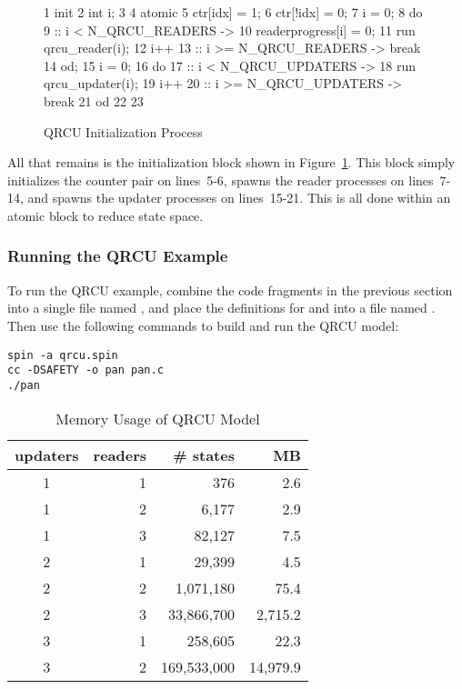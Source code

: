 \begin{figure}[htbp]
{ \scriptsize
\begin{verbbox}
  1 init {
  2   int i;
  3
  4   atomic {
  5     ctr[idx] = 1;
  6     ctr[!idx] = 0;
  7     i = 0;
  8     do
  9     :: i < N_QRCU_READERS ->
 10       readerprogress[i] = 0;
 11       run qrcu_reader(i);
 12       i++
 13     :: i >= N_QRCU_READERS -> break
 14     od;
 15     i = 0;
 16     do
 17     :: i < N_QRCU_UPDATERS ->
 18       run qrcu_updater(i);
 19       i++
 20     :: i >= N_QRCU_UPDATERS -> break
 21     od
 22   }
 23 }
\end{verbbox}
}
\centering
\theverbbox
\caption{QRCU Initialization Process}
\label{fig:analysis:QRCU Initialization Process}
\end{figure}

All that remains is the initialization block shown in
Figure~\ref{fig:analysis:QRCU Initialization Process}.
This block simply initializes the counter pair on lines~5-6,
spawns the reader processes on lines~7-14, and spawns the updater
processes on lines~15-21.
This is all done within an atomic block to reduce state space.

\subsubsection{Running the QRCU Example}
\label{sec:formal:Running the QRCU Example}

To run the QRCU example, combine the code fragments in the previous
section into a single file named , and place the definitions
for  and  into a file named
.
Then use the following commands to build and run the QRCU model:

\vspace{5pt}
\begin{minipage}[t]{\columnwidth}
\scriptsize
\begin{verbatim}
spin -a qrcu.spin
cc -DSAFETY -o pan pan.c
./pan
\end{verbatim}
\end{minipage}
\vspace{5pt}

\begin{table}
\footnotesize
\centering
\begin{tabular}{c|r|r|r}
	updaters &
	    readers &
		   \# states & MB \\
	\hline
	1 & 1 &         376 &      2.6 \\
	\hline
	1 & 2 &       6,177 &      2.9 \\
	\hline
	1 & 3 &      82,127 &      7.5 \\
	\hline
	2 & 1 &      29,399 &      4.5 \\
	\hline
	2 & 2 &   1,071,180 &     75.4 \\
	\hline
	2 & 3 &  33,866,700 &  2,715.2 \\
	\hline
	3 & 1 &     258,605 &     22.3 \\
	\hline
	3 & 2 & 169,533,000 & 14,979.9 \\
\end{tabular}
\caption{Memory Usage of QRCU Model}
\label{tab:advsync:Memory Usage of QRCU Model}
\end{table}

